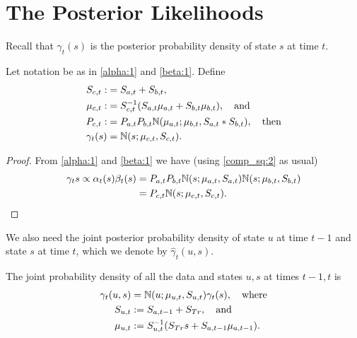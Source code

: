 \documentclass[12pt,leqno]{article}
\begin{document}
\section{The Posterior Likelihoods}
Recall that $\gamma_t(s)$ is the posterior probability density of state $s$
at time $t$. 
\begin{Thm}
  Let notation be as in \eqref{alpha:1} and \eqref{beta:1}.  Define
\begin{align*}
  S_{c,t} :&= S_{a,t} + S_{b,t}, \\
  \mu_{c,t} :&= S_{c,t}^{-1}(S_{a,t}\mu_{a,t} + S_{b,t}\mu_{b,t}), \quad\text{and}\\
  P_{c,t} :&= P_{a,t}P_{b,t}{\mathbb N}(\mu_{a,t};\mu_{b,t},S_{a,t}*S_{b,t}), \quad\text{then} \\
 \gamma_t(s) &= {\mathbb N}(s;\mu_{c,t},S_{c,t}).
  \end{align*}
\end{Thm}
\begin{proof}
  From \eqref{alpha:1} and \eqref{beta:1} we have (using \eqref{comp_sq:2}
  as usual)
  \begin{align*}
  \gamma_t{s} \propto \alpha_t(s)\beta_t(s) &= P_{a,t}P_{b,t}{\mathbb N}(s;\mu_{a,t},S_{a,t}){\mathbb N}(s;\mu_{b,t},S_{b,t})\\
  &= P_{c,t}{\mathbb N}(s;\mu_{c,t},S_{c,t}).
  \end{align*}
\end{proof}

We also need the joint posterior probability density of state $u$ at time $t-1$ and state $s$ at time $t$,
which we denote by $\hat{\gamma}_t(u,s)$.
\begin{Lem}\label{gamma_hat}
The joint probability density of all the data and states $u,s$  at times $t-1,t$ is
\begin{align*}
  \gamma_t(u,s) &= {\mathbb N}(u;\mu_{u,t},S_{u,t})\gamma_t(s), \quad\text{where} \\
  S_{u,t} &:= S_{a,t-1}+S_{Tr},\quad\text{and}\\
  \mu_{u,t} &:= S_{u,t}^{-1}(S_{Tr}s + S_{a,t-1}\mu_{a,t-1}).
\end{align*}
\end{Lem}
\end{document}
